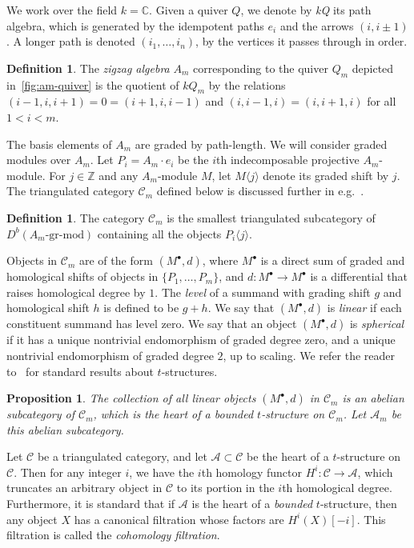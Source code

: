 \documentclass[submission]{FPSAC2025}
\newtheorem{proposition}[theorem]{Proposition}
\theoremstyle{definition}
\newtheorem{definition}[theorem]{Definition}
\newcommand{\darkblue}{\color{darkblue}} %
\newcommand{\defn}[1]{\textsl{\darkblue #1}} %
\begin{document}
We work over the field \(k = \mathbb{C}\).
Given a quiver \(Q\), we denote by \defn{kQ} its path algebra, which is generated by the idempotent paths \(e_i\) and the arrows \((i,i\pm1)\).
A longer path is denoted \((i_1,\ldots,i_n)\), by the vertices it passes through in order.
\begin{definition}
The \defn{zigzag algebra} \(A_m\) corresponding to the quiver \(Q_m\) depicted in~\cref{fig:am-quiver} is the quotient of \(kQ_m\) by the relations \((i-1, i, i+1) = 0 = (i+1, i, i-1)\) and \((i, i-1, i) = (i, i+1, i)\) for all~\(1 < i < m\).
\end{definition}
The basis elements of \(A_m\) are graded by path-length.
We will consider graded modules over \(A_m\).
Let \(P_i = A_m\cdot e_i\) be the \(i\)th indecomposable projective \(A_m\)-module.
For \(j \in \mathbb{Z}\) and any \(A_m\)-module \(M\), let \(M\langle j \rangle\) denote its graded shift by \(j\).
The triangulated category \(\mathcal{C}_m\) defined below is discussed further in e.g.~\cite[Sect.~2.3.3]{bap.deo.lic:22}.
\begin{definition}
The category \(\mathcal{C}_m\) is the smallest triangulated subcategory of \(D^b(A_m\text{-gr-mod})\) containing all the objects \(P_i\langle j \rangle\).
\end{definition}
Objects in \(\mathcal{C}_m\) are of the form \((M^{\bullet}, d)\), where \(M^{\bullet}\) is a direct sum of graded and homological shifts of objects in \(\{P_1,\ldots, P_m\}\), and \(d \colon M^{\bullet} \to M^{\bullet}\) is a differential that raises homological degree by \(1\).
The \defn{level} of a summand with grading shift \(g\) and homological shift \(h\) is defined to be \(g+h\).
We say that \((M^{\bullet},d)\) is \defn{linear} if each constituent summand has level zero.
We say that an object \((M^{\bullet},d)\) is \defn{spherical} if it has a unique nontrivial endomorphism of graded degree zero, and a unique nontrivial endomorphism of graded degree \(2\), up to scaling.
We refer the reader to~\cite{bel.ber.del:82} for standard results about \(t\)-structures.
\begin{proposition}
  The collection of all linear objects \((M^{\bullet}, d)\) in \(\mathcal{C}_m\) is an abelian subcategory of \(\mathcal{C}_m\), which is the heart of a bounded \(t\)-structure on \(\mathcal{C}_m\).
  Let \(\mathcal{A}_m\) be this abelian subcategory.
\end{proposition}

Let \(\mathcal{C}\) be a triangulated category, and let \(\mathcal{A} \subset \mathcal{C}\) be the heart of a \(t\)-structure on \(\mathcal{C}\).
Then for any integer \(i\), we have the \(i\)th homology functor
\(H^i \colon \mathcal {C} \to \mathcal{A}\),
which truncates an arbitrary object in \(\mathcal{C}\) to its portion in the \(i\)th homological degree.
Furthermore, it is standard that if \(\mathcal{A}\) is the heart of a \emph{bounded} \(t\)-structure, then any object \(X\) has a canonical filtration whose factors are \(H^i(X)[-i]\).
This filtration is called the \defn{cohomology filtration}.
\end{document}
